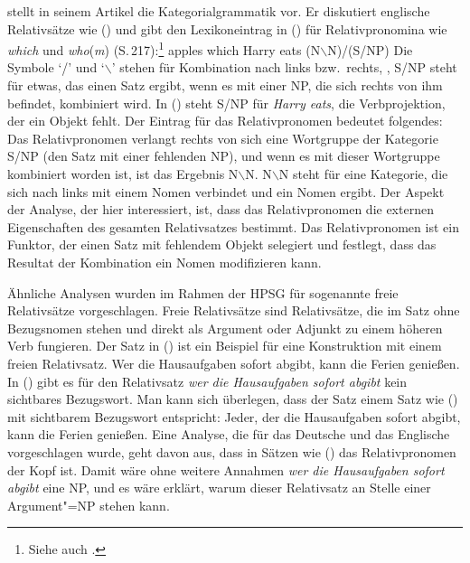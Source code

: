 \citet{Steedman89a} stellt in seinem Artikel die Kategorialgrammatik vor.
Er diskutiert englische Relativsätze wie () und gibt den
Lexikoneintrag in () für Relativpronomina wie \emph{which} und \emph{who}(\emph{m})
(S.\,217):\footnote{
  Siehe auch .
}
\ea
apples which Harry eats
\z
\ea
(N$\backslash$N)/(S/NP)
\z
Die Symbole `/' und `$\backslash$' stehen für Kombination nach links bzw.\
rechts, \dash, S/NP steht für etwas, das einen Satz ergibt, wenn es mit einer NP,
die sich rechts von ihm befindet, kombiniert wird. In (\mex{0}) steht
S/NP für \emph{Harry eats}, \dash die Verbprojektion, der ein Objekt fehlt.
Der Eintrag für das Relativpronomen bedeutet folgendes: Das Relativpronomen
verlangt rechts von sich eine Wortgruppe der Kategorie S/NP (den Satz mit einer
fehlenden NP), und wenn es mit dieser Wortgruppe kombiniert worden ist, ist das
Ergebnis N$\backslash$N. N$\backslash$N steht für eine Kategorie, die sich
nach links mit einem Nomen verbindet und ein Nomen ergibt. 
Der Aspekt der Analyse, der hier interessiert, ist, dass das Relativpronomen
die externen Eigenschaften des gesamten Relativsatzes bestimmt. Das Relativpronomen
ist ein Funktor, der einen Satz mit fehlendem Objekt selegiert und festlegt,
dass das Resultat der Kombination ein Nomen modifizieren kann.

Ähnliche Analysen wurden im Rahmen der HPSG für sogenannte freie Relativsätze
vorgeschlagen. Freie Relativsätze sind Relativsätze, die im Satz ohne Bezugsnomen
stehen und direkt als Argument oder Adjunkt zu einem höheren Verb fungieren.
Der Satz in (\mex{1}) ist ein Beispiel für eine Konstruktion mit einem freien Relativsatz.
\ea
Wer die Hausaufgaben sofort abgibt, kann die Ferien genießen.
\z
In () gibt es für den Relativsatz \emph{wer die Hausaufgaben sofort abgibt} kein
sichtbares Bezugswort. Man kann sich überlegen, dass der Satz einem Satz wie (\mex{1})
mit sichtbarem Bezugswort entspricht:
\ea
Jeder, der die Hausaufgaben sofort abgibt, kann die Ferien genießen.
\z
Eine Analyse, die für das Deutsche \citep{Kubota2003a-u} und das Englische \citep{WK03a}
vorgeschlagen wurde, geht davon aus, dass in Sätzen wie () das Relativpronomen der Kopf ist.
Damit wäre ohne weitere Annahmen \emph{wer die Hausaufgaben sofort abgibt} eine NP,
und es wäre erklärt, warum dieser Relativsatz an Stelle einer Argument"=NP stehen kann.

